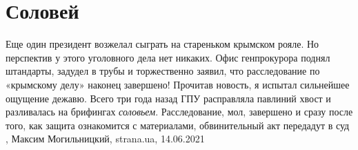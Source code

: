  
 
 
 
 
\chapter{Соловей}
\label{sec:slova.solovej}

Еще один президент возжелал сыграть на стареньком крымском рояле. Но
перспектив у этого уголовного дела нет никаких. Офис генпрокурора поднял
штандарты, задудел в трубы и торжественно заявил, что расследование по
«крымскому делу» наконец завершено! Прочитав новость, я испытал сильнейшее
ощущение дежавю. Всего три года назад ГПУ расправляла павлиний хвост и
разливалась на брифингах \emph{соловьем}. Расследование, мол, завершено и сразу
после того, как защита ознакомится с материалами, обвинительный акт передадут в
суд
, 
Максим Могильницкий, strana.ua, 14.06.2021

